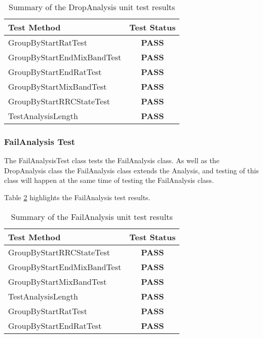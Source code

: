 \begin{table}[h]
  \centering
  \begin{tabular}{|l|c|}
    \hline
    {\bfseries Test Method}    & {\bfseries Test Status} \\ 
    \hline
    GroupByStartRatTest        & {\bfseries \color{OliveGreen} PASS}  \\ 
    GroupByStartEndMixBandTest & {\bfseries \color{OliveGreen} PASS}  \\ 
    GroupByStartEndRatTest     & {\bfseries \color{OliveGreen} PASS}  \\ 
    GroupByStartMixBandTest    & {\bfseries \color{OliveGreen} PASS}  \\ 
    GroupByStartRRCStateTest   & {\bfseries \color{OliveGreen} PASS}  \\ 
    TestAnalysisLength         & {\bfseries \color{OliveGreen} PASS}  \\
    \hline
  \end{tabular}
  \caption[Summary of the DropAnalysis unit test results]
          {Summary of the DropAnalysis unit test results}
  \label{tab:drop_analysis_test}
\end{table}


\subsubsection{FailAnalysis Test}
The {\ttfamily FailAnalysisTest} class tests the {\ttfamily FailAnalysis} 
class. As well as the {\ttfamily DropAnalysis} class the {\ttfamily FailAnalysis} 
class extends the {\ttfamily Analysis}, and testing of this class will happen 
at the same time of testing the {\ttfamily FailAnalysis} class.

Table \ref{tab:fail_analysis_test} highlights the FailAnalysis test results.

\begin{table}[h]
  \centering
  \begin{tabular}{|l|c|}
    \hline
    {\bfseries Test Method}    & {\bfseries Test Status} \\ 
    \hline
    GroupByStartRRCStateTest   & {\bfseries \color{OliveGreen} PASS}  \\ 
    GroupByStartEndMixBandTest & {\bfseries \color{OliveGreen} PASS}  \\ 
    GroupByStartMixBandTest    & {\bfseries \color{OliveGreen} PASS}  \\ 
    TestAnalysisLength         & {\bfseries \color{OliveGreen} PASS}  \\ 
    GroupByStartRatTest        & {\bfseries \color{OliveGreen} PASS}  \\ 
    GroupByStartEndRatTest     & {\bfseries \color{OliveGreen} PASS}  \\
    \hline
  \end{tabular}
  \caption[Summary of the FailAnalysis unit test results]
          {Summary of the FailAnalysis unit test results}
  \label{tab:fail_analysis_test}
\end{table}


